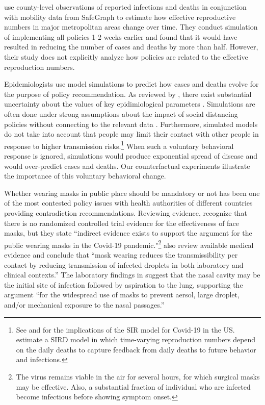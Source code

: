 \documentclass[11pt,reqno,letter]{amsart}
\theoremstyle{definition}
\begin{document}
 \cite{pei2020} use county-level observations of reported infections and deaths in conjunction with mobility  data from SafeGraph to estimate how effective reproductive numbers in major metropolitan areas change over time. They conduct simulation of implementing all policies 1-2 weeks earlier and found that it would have resulted in reducing the number of cases and deaths by more than half. However, their study does not  explicitly analyze how policies are related to
the effective reproduction numbers. %

Epidemiologists use model simulations to predict how cases and deaths evolve for the purpose of policy recommendation. As reviewed by \cite{avery2020}, there exist substantial uncertainty about the values of key epidimiological parameters \citep[see also][]{atkeson2020b,stock2020}. Simulations are often done under strong assumptions about the impact of social distancing policies without connecting to the relevant data  \citep[e.g.,][]{ferguson2020}. Furthermore, simulated models do not take into account that people may limit their contact with other people in response to higher transmission risks.\footnote{See \cite{atkeson2020a} and \cite{stock2020} for the implications of the SIR model for Covid-19 in the US. \cite{NBERw27128} estimate a SIRD model in which time-varying reproduction numbers depend on the daily deaths to capture feedback from daily deaths
to future behavior and infections.}  When such a voluntary behavioral response is ignored, simulations would produce exponential spread of disease and would over-predict  cases and deaths. Our counterfactual experiments  illustrate the importance of this voluntary behavioral change.




Whether wearing  masks in public place should be mandatory or not has been one of the most contested policy issues with health authorities of different countries providing contradiction recommendations. Reviewing evidence, \cite{Greenhalghm2020}  recognize that there is no randomized controlled trial evidence for the effectiveness of face masks,  but they state ``indirect evidence exists to support the argument for the public wearing masks in the Covid-19 pandemic."\footnote{The virus remains viable in the air for several hours, for which surgical masks may be effective. Also, a substantial fraction of individual who are infected become infectious before showing symptom onset.}
\cite{howard2020} also review available medical evidence and conclude that ``mask wearing reduces the transmissibility per contact by reducing transmission of infected droplets in both laboratory and clinical contexts.''  The laboratory findings in \cite{hou2020} suggest that the nasal cavity may be the initial site of infection followed by aspiration to the lung, supporting the argument  ``for the widespread use of masks to prevent aersol, large droplet, and/or mechanical exposure to the nasal passages.''
\end{document}
